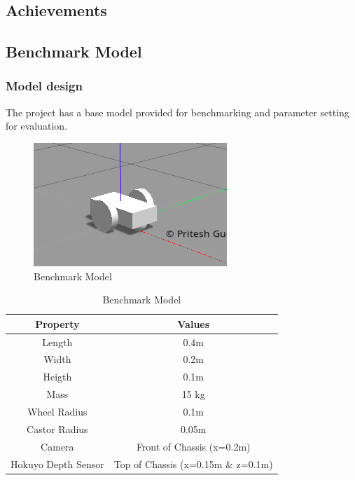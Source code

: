 \documentclass[10pt,journal,compsoc]{IEEEtran}
\begin{document}
\subsection{Achievements}
\subsection{Benchmark Model}
\subsubsection{Model design}
The project has a base model provided for benchmarking and parameter setting for evaluation. 

\begin{figure}[thpb]
      \centering
      \includegraphics[width=\linewidth]{images/basic_setup1}
      \caption{Benchmark Model}
      \label{fig:benchmarkmodel}
\end{figure}

\begin{table}[h]
\caption{ Benchmark Model}
\label{benchmarkmodeltable}
\begin{center}
\begin{tabular}{|c|c|}
\hline
Property & Values\\
\hline
Length & 0.4m \\
\hline
Width & 0.2m \\
\hline
Heigth & 0.1m \\
\hline
Mass & 15 kg \\
\hline
Wheel Radius & 0.1m \\
\hline
Castor Radius & 0.05m \\
\hline
Camera & Front of Chassis (x=0.2m) \\
\hline
Hokuyo Depth Sensor & Top of Chassis (x=0.15m \& z=0.1m) \\
\hline
\end{tabular}
\end{center}
\end{table}
\end{document}
